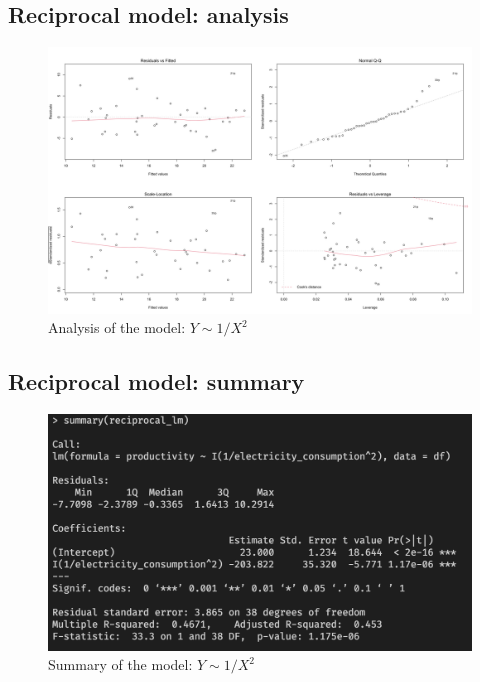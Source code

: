 \subsection{Reciprocal model: analysis}

\begin{figure}[H]
  \centering
  \includegraphics[width=\textwidth]{figures/png/reciprocal_model_analysis.png}
  \caption{Analysis of the model: $Y \sim 1/X^2$}
  \label{fig:reciprocal-model-analysis}
\end{figure}

\subsection{Reciprocal model: summary}

\begin{figure}[H]
  \centering
  \includegraphics[width=\textwidth]{figures/png/reciprocal-model-summary.png}
  \caption{Summary of the model: $Y \sim 1/X^2$}
  \label{fig:reciprocal-model-summary}
\end{figure}

